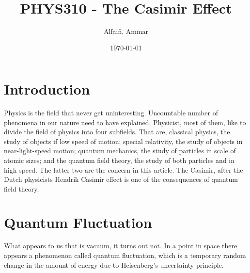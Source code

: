 \documentclass{article}
\title{PHYS310 - The Casimir Effect}
\author{Alfaifi, Ammar}
\date{\today}
\begin{document}
    \maketitle
    \section{Introduction}
        \paragraph{} 
        Physics is the field that never get uninteresting. Uncountable number of phenomena in our
        nature need to have explained. Physicist, most of them, like to divide the field of physics into four
        subfields. That are, classical physics, the study of objects if low speed of motion; special 
        relativity, the study of objects in near-light-speed motion; quantum mechanics, the study of
        particles in scale of atomic sizes; and the quantum field theory, the study of both particles and 
        in high speed. The latter two are the concern in this article. The Casimir, after the Dutch 
        physicists Hendrik Casimir effect is one of the consequences of quantum field theory.

    \section{Quantum Fluctuation}
        \paragraph{}
        What appears to us that is vacuum, it turns out not. In a point in space there appears a phenomenon
        called quantum fluctuation, which is a temporary random change in the amount of energy due to
        Heisenberg's uncertainty principle. 
\end{document}
